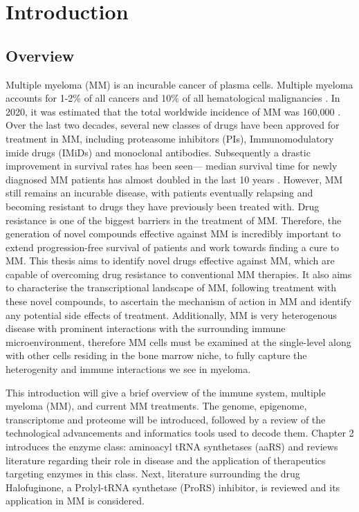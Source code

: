\chapter{\label{ch:1-intro}Introduction} 


\section{Overview}
Multiple myeloma (MM) is an incurable cancer of plasma cells.
Multiple myeloma accounts for 1-2\% of all cancers and 10\% of all hematological malignancies \cite{international2003criteria}.
In 2020, it was estimated that the total worldwide incidence of MM was 160,000 \cite{ludwig2020multiple}.
Over the last two decades, several new classes of drugs have been approved for treatment in MM, including proteasome inhibitors (PIs), Immunomodulatory imide drugs (IMiDs) and monoclonal antibodies.
Subsequently a drastic improvement in survival rates has been seen--- median survival time for newly diagnosed MM patients has almost doubled in the last 10 years \cite{kazandjian2016look}.
However, MM still remains an incurable disease, with patients eventually relapsing and becoming resistant to drugs they have previously been treated with.
Drug resistance is one of the biggest barriers in the treatment of MM.
Therefore, the generation of novel compounds effective against MM is incredibly important to extend progression-free survival of patients and work towards finding a cure to MM\@.
This thesis aims to identify novel drugs effective against MM, which are capable of overcoming drug resistance to conventional MM therapies.
It also aims to characterise the transcriptional landscape of MM, following treatment with these novel compounds, to ascertain the mechanism of action in MM and identify any potential side effects of treatment.
Additionally, MM is very heterogenous disease with prominent interactions with the surrounding immune microenvironment, therefore MM cells must be examined at the single-level along with other cells residing in the bone marrow niche, to fully capture the heterogenity and immune interactions we see in myeloma.

This introduction will give a brief overview of the immune system, multiple myeloma (MM), and current MM treatments.
The genome, epigenome, transcriptome and proteome will be introduced, followed by a review of the technological advancements and informatics tools used to decode them.
Chapter 2 introduces the enzyme class: aminoacyl tRNA synthetases (aaRS) and reviews literature regarding their role in disease and the application of therapeutics targeting enzymes in this class.
Next, literature surrounding the drug Halofuginone, a Prolyl-tRNA synthetase (ProRS) inhibitor, is reviewed and its application in MM is considered.

